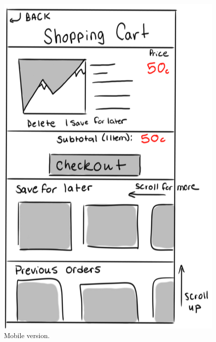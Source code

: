 \documentclass[]{article}
\begin{document}
\begin{enumerate}
		\begin{figure}
		  \includegraphics[width=\linewidth]{./pictures/shopping_cart_mobile.png}
		  \caption{Mobile version.}
		  \label{fig:mobile9}
		\end{figure}
		

\end{enumerate}
\end{document}
